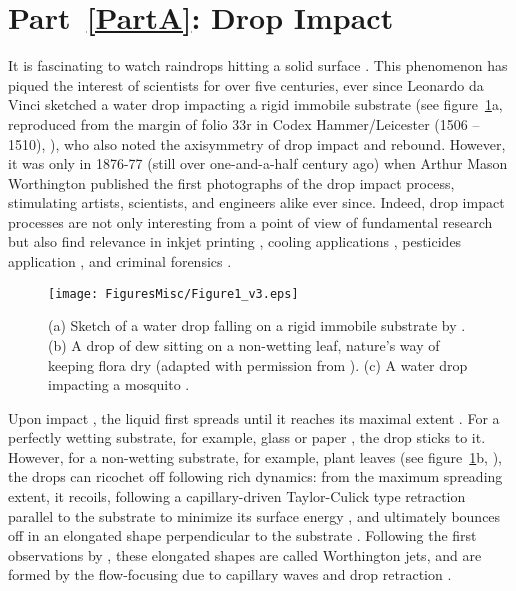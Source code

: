 \section*{Part~\ref{PartA}: Drop Impact}

It is fascinating to watch raindrops hitting a solid surface \citep{kim2020raindrop, lohse-2020-pnas}. This phenomenon has piqued the interest of scientists for over five centuries, ever since Leonardo da Vinci sketched a water drop impacting a rigid immobile substrate (see figure~\ref{Ch0::Fig1}a, reproduced from the margin of folio 33r in Codex Hammer/Leicester (1506 -- 1510), \citep{da1508notebooks}), who also noted the axisymmetry of drop impact and rebound. However, it was only in 1876-77 (still over one-and-a-half century ago) when Arthur Mason Worthington \citep{worthington1877xxviii, worthington1877second} published the first photographs of the drop impact process, stimulating artists, scientists, and engineers alike ever since. Indeed, drop impact processes are not only interesting from a point of view of fundamental research but also find relevance in inkjet printing \cite{lohse2022fundamental}, cooling applications \cite{kim2007spray, shiri2017heat, jowkar2019rebounding}, pesticides application \cite{he2021optimization, hoffman2021controlling}, and criminal forensics \cite{smith2018influence}.

\begin{figure}
	\centering
	\texttt{[image: FiguresMisc/Figure1\_v3.eps]}
	\caption{(a) Sketch of a water drop falling on a rigid immobile substrate by \citet{da1508notebooks}. (b) A drop of dew sitting on a non-wetting leaf, nature's way of keeping flora dry (adapted with permission from \citet{carolaThesis}). (c) A water drop impacting  a mosquito \citep{dickerson2012mosquitoes}.}
	\label{Ch0::Fig1}
\end{figure}

Upon impact \citep{wagner1932stoss}, the liquid first spreads \citep{philippi2016, Gordillo2018} until it reaches its maximal extent \citep{clanet2004,laan2014maximum, wildeman2016spreading, gordillo2019theory}. For a perfectly wetting substrate, for example, glass or paper \citep{lohse2022fundamental}, the drop sticks to it. However, for a non-wetting substrate, for example, plant leaves (see figure~\ref{Ch0::Fig1}b, \citep{neinhuis1997characterization, quere2008wetting, carolaThesis}), the drops can ricochet off following rich dynamics: from the maximum spreading extent, it recoils, following a capillary-driven Taylor-Culick type retraction parallel to the substrate to minimize its surface energy \citep{taylor-1959-procrsoclonda, culick-1960-japplphys, bartolo2005retraction, pierson2020revisiting, deka2020revisiting, sanjay2022taylor}, and ultimately bounces off in an elongated shape perpendicular to the substrate \citep{richard2000bouncing, yarin2006drop, josserand2016drop}. Following the first observations by \citet{worthington1877xxviii, worthington1877second}, these elongated shapes are called Worthington jets, and are formed by the flow-focusing due to capillary waves \citep{renardy2003pyramidal, bartolo2006singular} and drop retraction \citep{bartolo2005retraction}.

